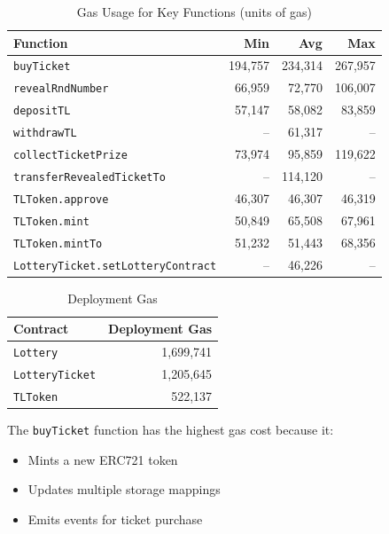 \documentclass[12pt,a4paper]{article}
\begin{document}
\begin{table}[H]
    \centering
    \begin{tabular}{@{}lrrr@{}}
        \toprule
        \textbf{Function} & \textbf{Min} & \textbf{Avg} & \textbf{Max} \\
        \midrule
        \texttt{buyTicket}                 & 194,757 & 234,314 & 267,957 \\
        \texttt{revealRndNumber}           & 66,959  & 72,770  & 106,007 \\
        \texttt{depositTL}                 & 57,147  & 58,082  & 83,859 \\
        \texttt{withdrawTL}                & --       & 61,317  & --      \\
        \texttt{collectTicketPrize}        & 73,974  & 95,859  & 119,622 \\
        \texttt{transferRevealedTicketTo}  & --       & 114,120 & --      \\
        \midrule
        \texttt{TLToken.approve}           & 46,307  & 46,307  & 46,319 \\
        \texttt{TLToken.mint}              & 50,849  & 65,508  & 67,961 \\
        \texttt{TLToken.mintTo}            & 51,232  & 51,443  & 68,356 \\
        \texttt{LotteryTicket.setLotteryContract} & --  & 46,226  & --     \\
        \bottomrule
    \end{tabular}
    \caption{Gas Usage for Key Functions (units of gas)}
    \label{tab:gas}
\end{table}

\begin{table}[H]
    \centering
    \begin{tabular}{@{}lr@{}}
        \toprule
        \textbf{Contract} & \textbf{Deployment Gas} \\
        \midrule
        \texttt{Lottery}        & 1,699,741 \\
        \texttt{LotteryTicket}  & 1,205,645 \\
        \texttt{TLToken}        & 522,137 \\
        \bottomrule
    \end{tabular}
    \caption{Deployment Gas}
    \label{tab:deploygas}
\end{table}

The \texttt{buyTicket} function has the highest gas cost because it:
\begin{itemize}
    \item Mints a new ERC721 token
    \item Updates multiple storage mappings
    \item Emits events for ticket purchase
\end{itemize}
\end{document}
